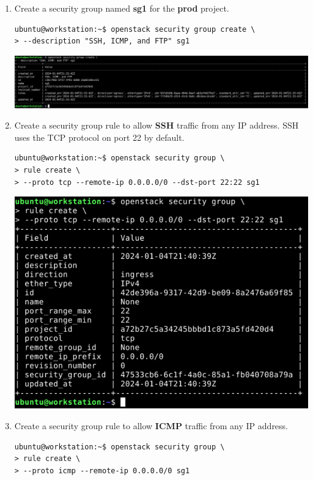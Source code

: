 \documentclass[letterpaper, 12pt]{article}
\begin{document}
\begin{enumerate}
    \item Create a security group named \textbf{sg1} for the \textbf{prod} project.
\begin{lstlisting}
ubuntu@workstation:~$ openstack security group create \
> --description "SSH, ICMP, and FTP" sg1
\end{lstlisting}    

    \begin{center}
        \includegraphics[width=\linewidth]{images/part1/step28.png}
    \end{center}

    \item Create a security group rule to allow \textbf{SSH} traffic from any IP address. SSH uses the TCP protocol on
    port 22 by default.
\begin{lstlisting}
ubuntu@workstation:~$ openstack security group \
> rule create \
> --proto tcp --remote-ip 0.0.0.0/0 --dst-port 22:22 sg1
\end{lstlisting}

    \begin{center}
        \includegraphics[width=\linewidth]{images/part1/step29.png}
    \end{center}

    \item Create a security group rule to allow \textbf{ICMP} traffic from any IP address.
\begin{lstlisting}
ubuntu@workstation:~$ openstack security group \
> rule create \
> --proto icmp --remote-ip 0.0.0.0/0 sg1
\end{lstlisting}


\end{enumerate}
\end{document}
